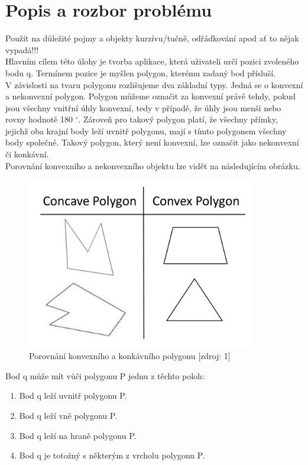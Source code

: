 \documentclass[a4paper, 12pt]{article}
\begin{document}
\clearpage

\section{Popis a rozbor problému}
Použít na důležité pojmy a objekty kurzívu/tučně, odřádkování apod ať to nějak vypadá!!!\\

Hlavním cílem této úlohy je tvorba aplikace, která uživateli určí pozici zvoleného bodu q. Termínem pozice je myšlen polygon, kterému zadaný bod přísluší.
\\

V závislosti na tvaru polygonu rozlišujeme dva základní typy. Jedná se o konvexní a nekonvexní polygon. Polygon můžeme označit za konvexní právě tehdy, pokud jsou všechny vnitřní úhly konvexní, tedy v případě, že úhly jsou menší nebo rovny hodnotě 180 $^\circ$. Zároveň pro takový polygon platí, že všechny přímky, jejichž oba krajní body leží uvnitř polygonu, mají s tímto polygonem všechny body společné. Takový polygon, který není konvexní, lze označit jako nekonvexní či konkávní.
\\

Porovnání konvexního a nekonvexního objektu lze vidět na následujícím obrázku.
\begin{figure}[h]
	\centering
	\includegraphics[width=10cm]{typy_polygonu.jpg}
	\caption{Porovnání konvexního a konkávního polygonu [zdroj: 1]}
\end{figure}

Bod q může mít vůči polygonu P jednu z těchto poloh:
\begin{enumerate}
\item Bod q leží uvnitř polygonu P.
\item Bod q leží vně polygonu P.
\item Bod q leží na hraně polygonu P.
\item Bod q je totožný s některým z vrcholu polygonu P.
\end{enumerate}
\end{document}
